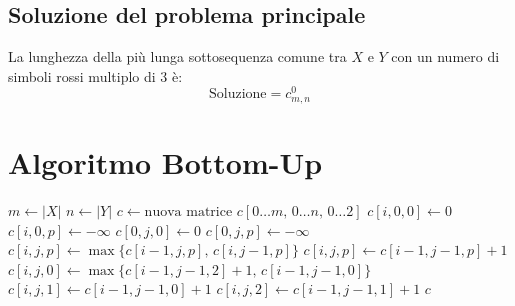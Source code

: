 \subsection{Soluzione del problema principale}
La lunghezza della più lunga sottosequenza comune tra $X$ e $Y$ con un numero di simboli rossi multiplo di $3$ è:
\[
    \text{Soluzione} = c_{m, n}^0
\]

\section{Algoritmo Bottom-Up}
\begin{algorithm}[htbp]
\caption{Calcolo Bottom-Up per LCS con numero di rossi multiplo di 3}
\begin{algorithmic}[1]
    \State $m \gets |X|$
    \State $n \gets |Y|$
    \State $c \gets \text{nuova matrice } c[0 \dots m, \, 0 \dots n, \, 0 \dots 2]$
        \State $c[i, 0, 0] \gets 0$
            \State $c[i, 0, p] \gets -\infty$
        \EndFor
    \EndFor
        \State $c[0, j, 0] \gets 0$
            \State $c[0, j, p] \gets -\infty$
        \EndFor
    \EndFor
                    \State $c[i, j, p] \gets \max \{ c[i-1, j, p], \, c[i, j-1, p] \}$
                \Else
                        \State $c[i, j, p] \gets c[i-1, j-1, p] + 1$
                    \Else
                            \State $c[i, j, 0] \gets \max \{ c[i-1, j-1, 2] + 1, \, c[i-1, j-1, 0] \}$
                            \State $c[i, j, 1] \gets c[i-1, j-1, 0] + 1$
                        \Else
                            \State $c[i, j, 2] \gets c[i-1, j-1, 1] + 1$
                        \EndIf
                    \EndIf
                \EndIf
            \EndFor
        \EndFor
    \EndFor
    \State \Return $c$
\EndProcedure
\end{algorithmic}
\end{algorithm}

